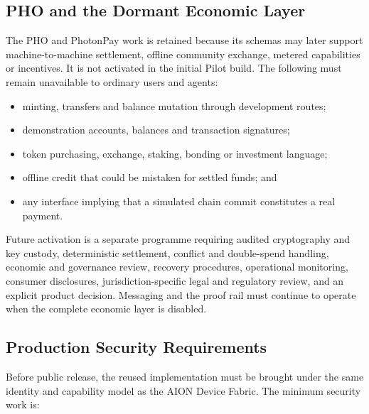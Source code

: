 \subsection{PHO and the Dormant Economic Layer}

The PHO and PhotonPay work is retained because its schemas may later support
machine-to-machine settlement, offline community exchange, metered capabilities
or incentives. It is not activated in the initial Pilot build. The following
must remain unavailable to ordinary users and agents:

\begin{itemize}
  \item minting, transfers and balance mutation through development routes;
  \item demonstration accounts, balances and transaction signatures;
  \item token purchasing, exchange, staking, bonding or investment language;
  \item offline credit that could be mistaken for settled funds; and
  \item any interface implying that a simulated chain commit constitutes a real
        payment.
\end{itemize}

Future activation is a separate programme requiring audited cryptography and
key custody, deterministic settlement, conflict and double-spend handling,
economic and governance review, recovery procedures, operational monitoring,
consumer disclosures, jurisdiction-specific legal and regulatory review, and
an explicit product decision. Messaging and the proof rail must continue to
operate when the complete economic layer is disabled.

\subsection{Production Security Requirements}

Before public release, the reused implementation must be brought under the same
identity and capability model as the AION Device Fabric. The minimum security
work is:

